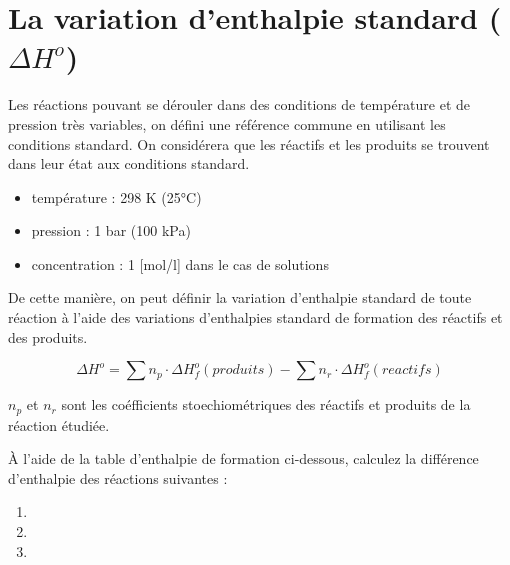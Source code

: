 \documentclass[
  11pt,
  french,
  a4paper,
  openany]{book}
\providecommand{\tightlist}{%
  \setlength{\itemsep}{0pt}\setlength{\parskip}{0pt}}
\begin{document}
\clearpage

\hypertarget{la-variation-denthalpie-standard-delta-ho}{%
\section{\texorpdfstring{La variation d'enthalpie standard (\(\Delta H^o\))}{La variation d'enthalpie standard (\textbackslash Delta H\^{}o)}}\label{la-variation-denthalpie-standard-delta-ho}}

Les réactions pouvant se dérouler dans des conditions de température et de pression très variables, on défini une référence commune en utilisant les conditions standard. On considérera que les réactifs et les produits se trouvent dans leur état aux conditions standard.

\begin{itemize}
\tightlist
\item
  température : 298 K (25°C)
\item
  pression : 1 bar (100 kPa)
\item
  concentration : 1 {[}mol/l{]} dans le cas de solutions
\end{itemize}

De cette manière, on peut définir la variation d'enthalpie standard de toute réaction à l'aide des variations d'enthalpies standard de formation des réactifs et des produits.

\[
\Delta H^o = \sum n_p \cdot \Delta H^{o}_f(produits) - \sum n_r \cdot \Delta H^{o}_f(reactifs)
\]

\(n_p\) et \(n_r\) sont les coéfficients stoechiométriques des réactifs et produits de la réaction étudiée.

\begin{Exercise}

À l'aide de la table d'enthalpie de formation ci-dessous, calculez la différence d'enthalpie des réactions suivantes :

\begin{enumerate}
\def\labelenumi{\arabic{enumi}.}
\item
\item
\item
\end{enumerate}


\end{Exercise}
\end{document}
